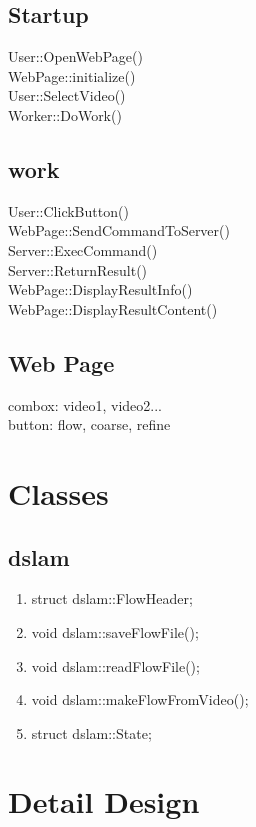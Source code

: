\documentclass{article}
\begin{document}
\subsection{Startup}

User::OpenWebPage()\\
\indent WebPage::initialize()\\
\indent User::SelectVideo()\\
\indent Worker::DoWork()

\subsection{work}
User::ClickButton()\\
\indent WebPage::SendCommandToServer()\\
\indent Server::ExecCommand()\\
\indent Server::ReturnResult()\\
\indent \indent WebPage::DisplayResultInfo()\\
\indent \indent WebPage::DisplayResultContent()

\subsection{Web Page}

combox: video1, video2...\\
button: flow, coarse, refine

\section{Classes}

\subsection{dslam}

\begin{enumerate}

\item struct dslam::FlowHeader;
\item void dslam::saveFlowFile();
\item void dslam::readFlowFile();
\item void dslam::makeFlowFromVideo();
\item struct dslam::State;
\end{enumerate}

\section{Detail Design}
\end{document}
